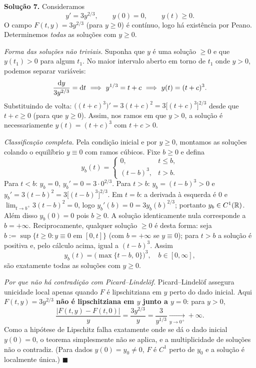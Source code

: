 \bigskip\noindent\textbf{Solução 7.}\quad
Consideramos
\[
y'=3y^{2/3},\qquad y(0)=0,\qquad y(t)\ge0 .
\]
O campo $F(t,y)=3y^{2/3}$ (para $y\ge0$) é contínuo, logo há existência por Peano. Determinemos \emph{todas} as soluções com $y\ge0$.

\emph{Forma das soluções não triviais.} Suponha que $y$ é uma solução $\ge0$ e que $y(t_1)>0$ para algum $t_1$. No maior intervalo aberto em torno de $t_1$ onde $y>0$, podemos separar variáveis:
\[
\frac{\d y}{3y^{2/3}}=\d t\ \Longrightarrow\ y^{1/3}=t+c\ \Longrightarrow\ y(t)=(t+c)^3 .
\]
Substituindo de volta: $\big((t+c)^3\big)'=3(t+c)^2=3\big[(t+c)^3\big]^{2/3}$ desde que $t+c\ge0$ (para que $y\ge0$). Assim, nos ramos em que $y>0$, a solução é necessariamente $y(t)=(t+c)^3$ com $t+c>0$.

\emph{Classificação completa.} Pela condição inicial e por $y\ge0$, montamos as soluções colando o equilíbrio $y\equiv0$ com ramos cúbicos. Fixe $b\ge0$ e defina
\begin{equation}\label{eq:p7-fam}
y_b(t)=\begin{cases}0, & t\le b,\\[2pt](t-b)^3, & t> b.\end{cases}
\end{equation}
Para $t<b$: $y_b=0$, $y_b'=0=3\cdot0^{2/3}$. Para $t>b$: $y_b=(t-b)^3>0$ e $y_b'=3(t-b)^2=3\big[(t-b)^3\big]^{2/3}$. Em $t=b$: a derivada à esquerda é $0$ e $\lim_{t\to b^+}3(t-b)^2=0$, logo $y_b'(b)=0=3y_b(b)^{2/3}$; portanto $y_b\in C^1(\mathbb{R})$. Além disso $y_b(0)=0$ pois $b\ge0$. A solução identicamente nula corresponde a $b=+\infty$. Reciprocamente, qualquer solução $\ge0$ é desta forma: seja $b:=\sup\{t\ge0:y\equiv0\text{ em }[0,t]\}$ (com $b=+\infty$ se $y\equiv0$); para $t>b$ a solução é positiva e, pelo cálculo acima, igual a $(t-b)^3$. Assim
\[
\boxed{\,y_b(t)=\big(\max\{t-b,\,0\}\big)^3,\quad b\in[0,\infty],\,}
\]
são exatamente todas as soluções com $y\ge0$.

\emph{Por que não há contradição com Picard--Lindelöf.} Picard--Lindelöf assegura unicidade local apenas quando $F$ é lipschitziana em $y$ perto do dado inicial. Aqui $F(t,y)=3y^{2/3}$ \textbf{não é lipschitziana em $y$ junto a $y=0$}: para $y>0$,
\[
\frac{|F(t,y)-F(t,0)|}{y}=\frac{3y^{2/3}}{y}=\frac{3}{y^{1/3}}\xrightarrow[y\to0^+]{}+\infty .
\]
Como a hipótese de Lipschitz falha exatamente onde se dá o dado inicial $y(0)=0$, o teorema simplesmente não se aplica, e a multiplicidade de soluções não o contradiz. (Para dados $y(0)=y_0\neq0$, $F$ é $C^1$ perto de $y_0$ e a solução é localmente única.)
\qquad$\blacksquare$



